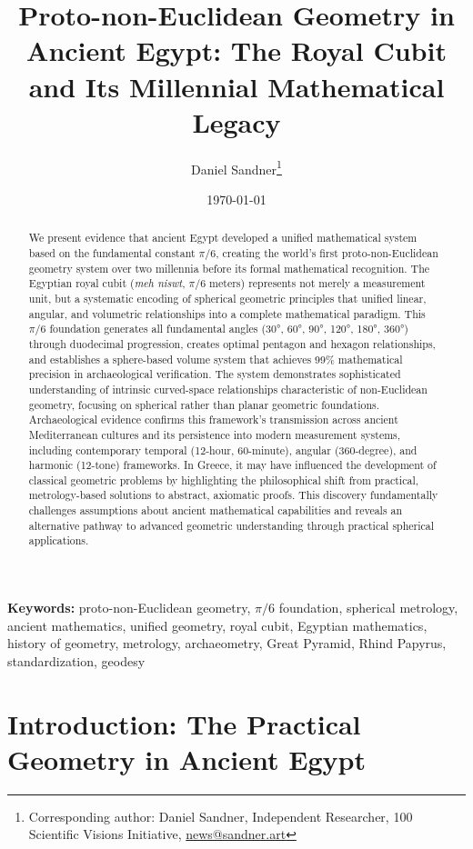 \documentclass[11pt]{article}
\title{Proto-non-Euclidean Geometry in Ancient Egypt: The Royal Cubit and Its Millennial Mathematical Legacy}
\author{{Daniel Sandner}\thanks{Corresponding author: Daniel Sandner, Independent Researcher, 100 Scientific Visions Initiative, \href{news@sandner.art}{news@sandner.art}}} %
\date{\today}
\begin{document}
\maketitle

\begin{abstract}
We present evidence that ancient Egypt developed a unified mathematical system based on the fundamental constant $\pi/6$, creating the world's first proto-non-Euclidean geometry system over two millennia before its formal mathematical recognition. The Egyptian royal cubit (\textit{meh niswt}, $\pi/6$ meters) represents not merely a measurement unit, but a systematic encoding of spherical geometric principles that unified linear, angular, and volumetric relationships into a complete mathematical paradigm. This $\pi/6$ foundation generates all fundamental angles (30°, 60°, 90°, 120°, 180°, 360°) through duodecimal progression, creates optimal pentagon and hexagon relationships, and establishes a sphere-based volume system that achieves 99\% mathematical precision in archaeological verification. The system demonstrates sophisticated understanding of intrinsic curved-space relationships characteristic of non-Euclidean geometry, focusing on spherical rather than planar geometric foundations. Archaeological evidence confirms this framework's transmission across ancient Mediterranean cultures and its persistence into modern measurement systems, including contemporary temporal (12-hour, 60-minute), angular (360-degree), and harmonic (12-tone) frameworks. In Greece, it may have influenced the development of classical geometric problems by highlighting the philosophical shift from practical, metrology-based solutions to abstract, axiomatic proofs. This discovery fundamentally challenges assumptions about ancient mathematical capabilities and reveals an alternative pathway to advanced geometric understanding through practical spherical applications.
\end{abstract}

\noindent\textbf{Keywords:} proto-non-Euclidean geometry, $\pi/6$ foundation, spherical metrology, ancient mathematics, unified geometry, royal cubit, Egyptian mathematics, history of geometry, metrology, archaeometry, Great Pyramid, Rhind Papyrus, standardization, geodesy

\section{Introduction: The Practical Geometry in Ancient Egypt}
\end{document}
